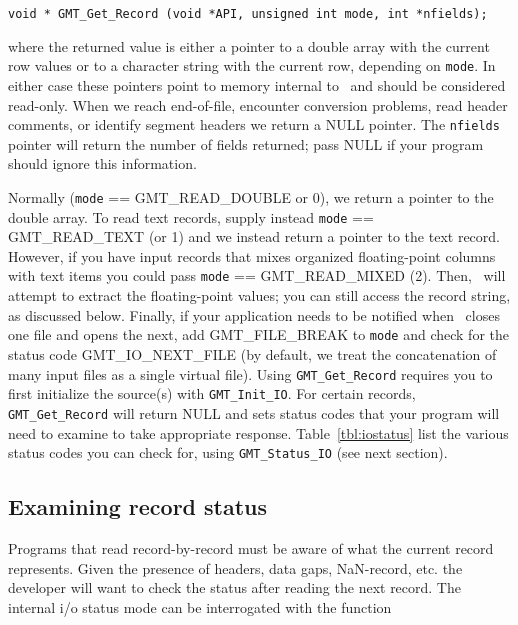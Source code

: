 \documentclass[11pt]{report}
\begin{document}
\begin{verbatim}
void * GMT_Get_Record (void *API, unsigned int mode, int *nfields);
\end{verbatim}
where the returned value is either a pointer to a double array with the current row values
or to a character string with the current row, depending on \texttt{mode}.
In either case these pointers point to memory internal to \GMT\ and should be considered read-only.
When we reach end-of-file, encounter conversion problems, read header comments, or identify
segment headers we return a NULL pointer.
The \texttt{nfields} pointer will return the number of fields returned; pass NULL if your program
should ignore this information.

Normally (\texttt{mode} == GMT\_READ\_DOUBLE or 0), we return a pointer to the double array.
To read text records, supply instead \texttt{mode} == GMT\_READ\_TEXT (or 1) and we
instead return a pointer to the text record.
However, if you have input records that mixes organized floating-point columns with text
items you could pass \texttt{mode} == GMT\_READ\_MIXED (2).  Then, \GMT\ will attempt to extract the
floating-point values; you can still access the record string, as discussed below.
Finally, if your application needs to be notified when \GMT\ closes one file and opens the next,
add GMT\_FILE\_BREAK to \texttt{mode} and check for the status code GMT\_IO\_NEXT\_FILE (by
default, we treat the concatenation of many input files as a single virtual file).
Using \texttt{GMT\_Get\_Record} requires you to first initialize the source(s)
with \texttt{GMT\_Init\_IO}.
For certain records, \texttt{GMT\_Get\_Record} will return NULL and sets status codes that your
program will need to examine to take appropriate response.  Table~\ref{tbl:iostatus}
list the various status codes you can check for, using \texttt{GMT\_Status\_IO} (see next section).

\subsection{Examining record status}

Programs that read record-by-record must be aware of what the current record represents.
Given the presence of headers, data gaps, NaN-record, etc. the developer will want to
check the status after reading the next record.  The internal i/o status mode can be
interrogated with the function
\end{document}
